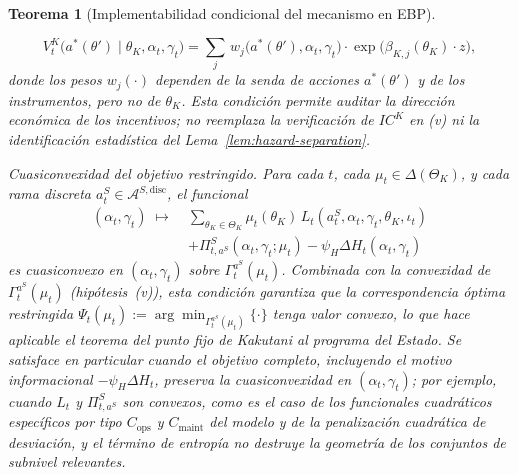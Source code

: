 \documentclass[pdflatex,sn-mathphys-ay]{sn-jnl}
\theoremstyle{thmstyleone}
\newtheorem{theorem}{Teorema}
\theoremstyle{thmstyletwo}
\theoremstyle{thmstylethree}
\newcommand{\ThetaK}{\Theta_K}
\newcommand{\1}{\mathbf{1}}
\begin{document}
\begin{theorem}[Implementabilidad condicional del mecanismo en EBP]
\begin{list}{}
  \[
    V^K_t\!\bigl(a^\ast(\theta')\mid\theta_K,\alpha_t,\gamma_t\bigr)
    =
    \sum_{j}\,w_j\!\bigl(a^\ast(\theta'),\alpha_t,\gamma_t\bigr)
    \cdot\exp\!\bigl(\beta_{K,j}(\theta_K)\cdot z\bigr),
  \]
  donde los pesos $w_j(\cdot)$ dependen de la senda de acciones $a^\ast(\theta')$ y de los instrumentos, pero no de $\theta_K$. Esta condición permite auditar la dirección económica de los incentivos; no reemplaza la verificación de $IC^K$ en \textup{(v)} ni la identificación estadística del Lema~\ref{lem:hazard-separation}.
  \item[\textup{(vii)}] Cuasiconvexidad del objetivo restringido. Para cada $t$, cada $\mu_t\in\Delta(\ThetaK)$, y cada rama discreta $a_t^S\in\mathcal{A}^{S,\mathrm{disc}}$, el funcional
  \[
  \begin{split}
  (\alpha_t,\gamma_t)\;\mapsto\;&\sum_{\theta_K\in\ThetaK}\mu_t(\theta_K)\,L_t(a_t^S,\alpha_t,\gamma_t,\theta_K,\iota_t) \\
  &+\Pi_{t,a^S}^S(\alpha_t,\gamma_t;\mu_t)
  -\psi_H\Delta H_t(\alpha_t,\gamma_t)
  \end{split}
  \]
  es cuasiconvexo en $(\alpha_t,\gamma_t)$ sobre $\Gamma_t^{a^S}(\mu_t)$. Combinada con la convexidad de $\Gamma_t^{a^S}(\mu_t)$ \textup{(}hipótesis~\textup{(v)}\textup{)}, esta condición garantiza que la correspondencia óptima restringida $\Psi_t(\mu_t):=\arg\min_{\Gamma_t^{a^S}(\mu_t)}\{\cdot\}$ tenga valor convexo, lo que hace aplicable el teorema del punto fijo de Kakutani al programa del Estado. Se satisface en particular cuando el objetivo completo, incluyendo el motivo informacional $-\psi_H\Delta H_t$, preserva la cuasiconvexidad en $(\alpha_t,\gamma_t)$; por ejemplo, cuando $L_t$ y $\Pi_{t,a^S}^S$ son convexos, como es el caso de los funcionales cuadráticos específicos por tipo $C_{\mathrm{ops}}$ y $C_{\mathrm{maint}}$ del modelo y de la penalización cuadrática de desviación, y el término de entropía no destruye la geometría de los conjuntos de subnivel relevantes.
\end{list}


\end{theorem}
\end{document}
